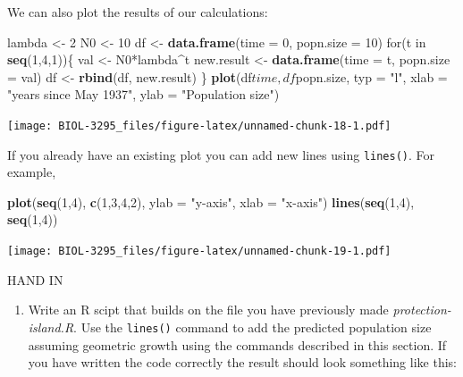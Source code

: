 \documentclass[]{book}
\newenvironment{Shaded}{\begin{snugshade}}{\end{snugshade}}
\newcommand{\KeywordTok}[1]{\textcolor[rgb]{0.13,0.29,0.53}{\textbf{{#1}}}}
\newcommand{\DataTypeTok}[1]{\textcolor[rgb]{0.13,0.29,0.53}{{#1}}}
\newcommand{\DecValTok}[1]{\textcolor[rgb]{0.00,0.00,0.81}{{#1}}}
\newcommand{\StringTok}[1]{\textcolor[rgb]{0.31,0.60,0.02}{{#1}}}
\newcommand{\NormalTok}[1]{{#1}}
\providecommand{\tightlist}{%
  \setlength{\itemsep}{0pt}\setlength{\parskip}{0pt}}
\begin{document}
We can also plot the results of our calculations:

\begin{Shaded}
\begin{Highlighting}[]
\NormalTok{lambda <-}\StringTok{ }\DecValTok{2}
\NormalTok{N0 <-}\StringTok{ }\DecValTok{10}
\NormalTok{df <-}\StringTok{ }\KeywordTok{data.frame}\NormalTok{(}\DataTypeTok{time =} \DecValTok{0}\NormalTok{, }\DataTypeTok{popn.size =} \DecValTok{10}\NormalTok{)}
\NormalTok{for(t in }\KeywordTok{seq}\NormalTok{(}\DecValTok{1}\NormalTok{,}\DecValTok{4}\NormalTok{,}\DecValTok{1}\NormalTok{))\{}
  \NormalTok{val <-}\StringTok{ }\NormalTok{N0*lambda^t}
  \NormalTok{new.result <-}\StringTok{ }\KeywordTok{data.frame}\NormalTok{(}\DataTypeTok{time =} \NormalTok{t, }\DataTypeTok{popn.size =} \NormalTok{val)}
  \NormalTok{df <-}\StringTok{ }\KeywordTok{rbind}\NormalTok{(df, new.result)}
\NormalTok{\}}
\KeywordTok{plot}\NormalTok{(df$time, df$popn.size, }\DataTypeTok{typ =} \StringTok{"l"}\NormalTok{, }\DataTypeTok{xlab =} \StringTok{"years since May 1937"}\NormalTok{, }\DataTypeTok{ylab =} \StringTok{"Population size"}\NormalTok{)}
\end{Highlighting}
\end{Shaded}

\texttt{[image: BIOL-3295\_files/figure-latex/unnamed-chunk-18-1.pdf]}

If you already have an existing plot you can add new lines using
\texttt{lines()}. For example,

\begin{Shaded}
\begin{Highlighting}[]
\KeywordTok{plot}\NormalTok{(}\KeywordTok{seq}\NormalTok{(}\DecValTok{1}\NormalTok{,}\DecValTok{4}\NormalTok{), }\KeywordTok{c}\NormalTok{(}\DecValTok{1}\NormalTok{,}\DecValTok{3}\NormalTok{,}\DecValTok{4}\NormalTok{,}\DecValTok{2}\NormalTok{), }\DataTypeTok{ylab =} \StringTok{"y-axis"}\NormalTok{, }\DataTypeTok{xlab =} \StringTok{"x-axis"}\NormalTok{)}
\KeywordTok{lines}\NormalTok{(}\KeywordTok{seq}\NormalTok{(}\DecValTok{1}\NormalTok{,}\DecValTok{4}\NormalTok{), }\KeywordTok{seq}\NormalTok{(}\DecValTok{1}\NormalTok{,}\DecValTok{4}\NormalTok{))}
\end{Highlighting}
\end{Shaded}

\texttt{[image: BIOL-3295\_files/figure-latex/unnamed-chunk-19-1.pdf]}

 HAND IN

\begin{enumerate}
\def\labelenumi{\arabic{enumi}.}
\setcounter{enumi}{4}
\tightlist
\item
  Write an R scipt that builds on the file you have previously made
  \emph{protection-island.R}. Use the \texttt{lines()} command to add
  the predicted population size assuming geometric growth using the
  commands described in this section. If you have written the code
  correctly the result should look something like this:
\end{enumerate}
\end{document}
